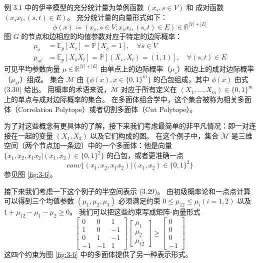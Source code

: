 \begin{tcolorbox}
\begin{exam}[伊辛模型的均值参数]

例 3.1 中的伊辛模型的充分统计量为单例函数 $(x_s, s \in V)$ 和 成对函数 $(x_sx_t, (s, t) \in E)$。
充分统计量的向量形式如下：
\begin{equation}
    \phi(x) \coloneqq (x_s, s \in V; x_sx_t, (s, t) \in E) \in \mathbb{R}^{|V| + |E|}
\end{equation}
图 $G$ 的节点和边相应的均值参数对应于特定的边际概率：
\begin{subequations}
\begin{align}
    \mu_s &= \mathbb{E}_p[X_s] = \mathbb{P}[X_s = 1], \quad \forall s \in V \\
    \mu_{st} &= \mathbb{E}_p[X_sX_t] = \mathbb{P}[(X_s, X_t) = (1, 1)], \quad \forall (s, t) \in E
\end{align}
\end{subequations}
可见平均参数向量 $\mu \in \mathbb{R}^{|V|+|E|}$ 由单点上的边际概率（$\mu_s$）和边上的成对边际概率（$\mu_{st}$）组成。
集合 $\mathcal{M}$ 由 $\{\phi(x), x \in \{0, 1\}^m\}$ 的凸包组成，其中 $\phi(x)$ 由式 (3.30) 给出。
用概率的术语来说，$\mathcal{M}$ 对应于所有定义在 $(X_1, \dots, X_m) \in \{0, 1\}^m$ 上的单点与成对边际概率的集合。
在多面体组合学中，这个集合被称为相关多面体（Correlation Polytope）或者切割多面体（Cut Polytope）。

为了对这些概念有更具体的了解，接下来我们考虑最简单的非平凡情况：即一对连接在一起的变量 $(X_1, X_2)$ 以及它们构成的图。
在这个例子中，集合 $\mathcal{M}$ 是三维空间（两个节点加一条边）中的一个多面体：他是向量 $\{x_1, x_2, x_1x_2| (x_1, x_2) \in \{0, 1\}^2\}$ 的凸包，或者更准确一点
$$conv\{(x_1, x_2, x_1x_2)| (x_1, x_2) \in \{0, 1\}^2\}$$
参见图 \ref{fig:3-6}。

接下来我们考虑一下这个例子的半空间表示 (3.29)。
由初级概率论和一点点计算可以得到三个均值参数 $(\mu_1, \mu_2, \mu_3)$ 必须满足约束 $0 \leq \mu_{12} \leq \mu_i (i = 1, 2)$ 以及 $1+ \mu_{12} - \mu_1 -\mu_2 \geq 0$。
我们可以把这些约束写成矩阵-向量形式
$$\begin{bmatrix}
    0 & 0 & 1 \\
    1 & 0 & -1 \\
    0 & 1 & -1 \\
    -1 & -1 & 1
\end{bmatrix}\begin{bmatrix}
    \mu_1 \\
    \mu_2 \\
    \mu_{12}
\end{bmatrix} \geq \begin{bmatrix}
    0 \\
    0 \\
    0 \\
    -1
\end{bmatrix}$$
这四个约束为图 \ref{fig:3-6} 中的多面体提供了另一种表示形式。

\end{exam}
\end{tcolorbox}

